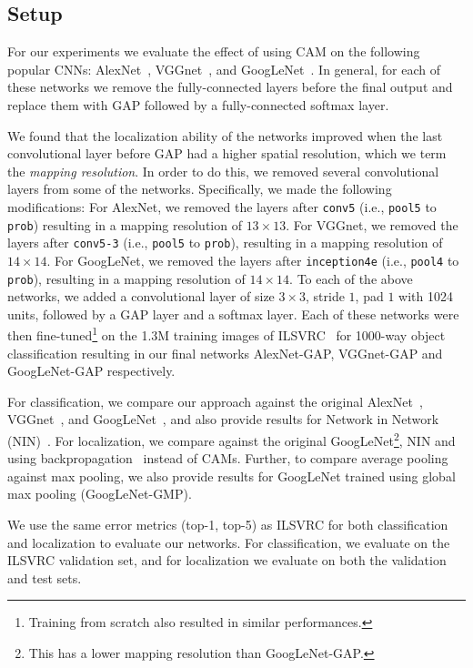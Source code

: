 \documentclass[10pt,twocolumn,letterpaper]{article}
\begin{document}
\subsection{Setup}
\label{sec:locsetup}
For our experiments we evaluate the effect of using CAM on the following popular CNNs: AlexNet~\cite{krizhevsky2012imagenet}, VGGnet~\cite{simonyan2014very}, and GoogLeNet~\cite{szegedy2014going}. In general, for each of these networks we remove the fully-connected layers before the final output and replace them with GAP followed by a fully-connected softmax layer. 

We found that the localization ability of the networks improved when the last convolutional layer before GAP had a higher spatial resolution, which we term the \textit{mapping resolution}. In order to do this, we removed several convolutional layers from some of the networks. Specifically, we made the following modifications: For AlexNet, we removed the layers after \texttt{conv5}
(i.e., \texttt{pool5} to \texttt{prob}) resulting in a mapping resolution of $13 \times 13$. For VGGnet, we removed the layers after \texttt{conv5-3} (i.e., \texttt{pool5} to \texttt{prob}), resulting in a mapping resolution of $14 \times 14$. For GoogLeNet, we removed the layers after \texttt{inception4e} (i.e., \texttt{pool4} to \texttt{prob}), resulting in a mapping resolution of $14 \times 14$. To each of the above networks, we added a convolutional layer of size $3\times3$, stride $1$, pad $1$ with 1024 units, followed by a GAP layer and a softmax layer. Each of these networks were then fine-tuned\footnote{Training from scratch also resulted in similar performances.} on the 1.3M training images of ILSVRC~\cite{ILSVRCijcv15} for 1000-way object classification resulting in our final networks AlexNet-GAP, VGGnet-GAP and GoogLeNet-GAP respectively.

For classification, we compare our approach against the original AlexNet~\cite{krizhevsky2012imagenet}, VGGnet~\cite{simonyan2014very}, and GoogLeNet~\cite{szegedy2014going}, and also provide results for Network in Network (NIN)~\cite{lin2013network}. For localization, we compare against the original GoogLeNet\footnote{This has a lower mapping resolution than GoogLeNet-GAP.}, NIN and using backpropagation~\cite{simonyan2013deep} instead of CAMs. Further, to compare average pooling against max pooling, we also provide results for GoogLeNet trained using global max pooling (GoogLeNet-GMP).

We use the same error metrics (top-1, top-5) as ILSVRC for both classification and localization to evaluate our networks. For classification, we evaluate on the ILSVRC validation set, and for localization we evaluate on both the validation and test sets. 
\end{document}
